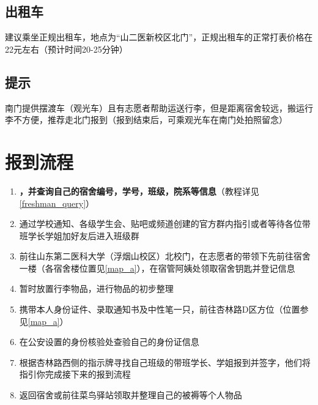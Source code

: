 \subsection[出租车]{出租车}
建议乘坐正规出租车，地点为“山二医新校区北门”，正规出租车的正常打表价格在22元左右（预计时间20-25分钟）

\subsection[提示]{提示}
南门提供摆渡车（观光车）且有志愿者帮助运送行李，但是距离宿舍较远，搬运行李不方便，推荐走北门报到（报到结束后，可乘观光车在南门处拍照留念）

\section[报到流程]{报到流程}
\begin{enumerate}
      \item \textbf{，并查询自己的宿舍编号，学号，班级，院系等信息}\footnotemark（教程详见\uline{\ref{freshman_query}}）
      \item 通过学校通知、各级学生会、贴吧或频道创建的官方群内指引或者等待各位带班学长学姐加好友后进入班级群\footnotemark
      \item 前往山东第二医科大学（浮烟山校区）北校门，在志愿者\footnotemark 的带领下先前往宿舍一楼（各宿舍楼位置见\uline{\ref{map_a}}），在宿管阿姨处领取宿舍钥匙并登记信息
      \item 暂时放置行李物品，进行物品的初步整理
      \item 携带本人身份证件、录取通知书\footnotemark 及中性笔一只，前往杏林路D区方位（位置参见\uline{\ref{map_a}}）
      \item 在公安设置的身份核验处查验自己的身份证\footnotemark 信息
      \item 根据杏林路西侧的指示牌寻找自己班级的带班学长、学姐报到并签字，他们将指引你完成接下来的报到流程\footnotemark
      \item 返回宿舍或前往菜鸟驿站领取并整理自己的被褥等个人物品
\end{enumerate}